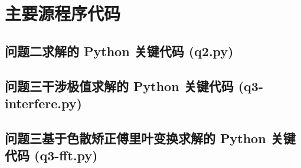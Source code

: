 \documentclass[a4paper]{ctexart}
\begin{document}

\section{主要源程序代码}


\subsection{问题二求解的 Python 关键代码 (q2.py)}

% 
%
\subsection{问题三干涉极值求解的 Python 关键代码 (q3-interfere.py)}

\subsection{问题三基于色散矫正傅里叶变换求解的 Python 关键代码 (q3-fft.py)}





\end{document}
